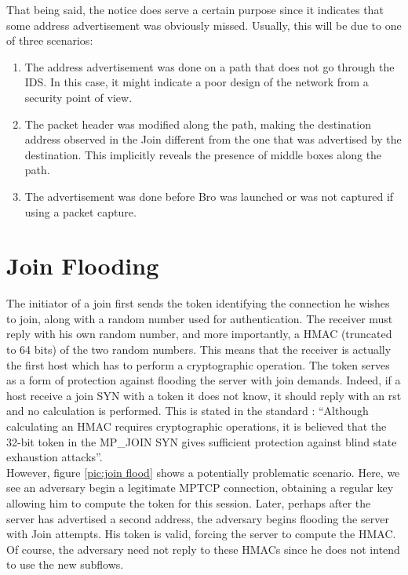 That being said, the notice does serve a certain purpose since it indicates that some address advertisement was obviously missed. Usually, this will be due to one of three scenarios: \\

\begin{enumerate}
\item The address advertisement was done on a path that does not go through the IDS. In this case, it might indicate a poor design of the network from a security point of view.
\item The packet header was modified along the path, making the destination address observed in the Join different from the one that was advertised by the destination. This implicitly reveals the presence of middle boxes along the path.
\item The advertisement was done before Bro was launched or was not captured if using a packet capture.
\end{enumerate}


\section{Join Flooding}
The initiator of a join first sends the token identifying the connection he wishes to join, along with a random number used for authentication. The receiver must reply with his own random number, and more importantly, a HMAC (truncated to 64 bits) of the two random numbers. This means that the receiver is actually the first host which has to perform a cryptographic operation. The token serves as a form of protection against flooding the server with join demands. Indeed, if a host receive a join SYN with a token it does not know, it should reply with an rst and no calculation is performed. This is stated in the standard \cite{rfc6824}: ``Although calculating an HMAC requires cryptographic operations, it is believed that the 32-bit token in the MP\_JOIN SYN gives sufficient protection against blind state exhaustion attacks''.\\

However, figure \ref{pic:join flood} shows a potentially problematic scenario. Here, we see an adversary begin a legitimate MPTCP connection, obtaining a regular key allowing him to compute the token for this session. Later, perhaps after the server has advertised a second address, the adversary begins flooding the server with Join attempts. His token is valid, forcing the server to compute the HMAC. Of course, the adversary need not reply to these HMACs since he does not intend to use the new subflows. \\

